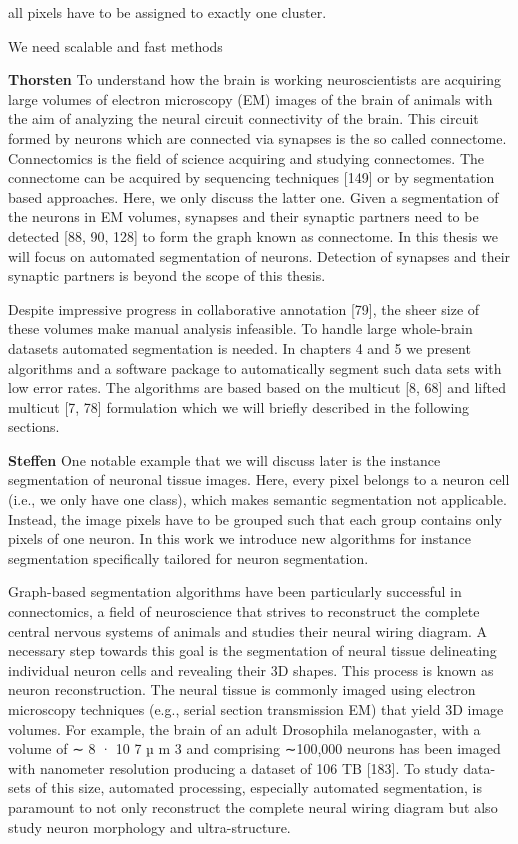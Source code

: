 all pixels have to be assigned to exactly one cluster. 

We need scalable and fast methods



\textbf{Thorsten}
To understand how the brain is working neuroscientists are acquiring large volumes of electron microscopy (EM) images of the brain of animals with the aim of analyzing the neural circuit connectivity of the brain. This circuit formed by neurons which are connected via synapses is the so called connectome. Connectomics is the ﬁeld of science acquiring and studying connectomes. The connectome can be acquired by sequencing techniques [149] or by segmentation based approaches. Here, we only discuss the latter one. Given a segmentation of the neurons in EM volumes, synapses and their synaptic partners need to be detected [88, 90, 128] to form the graph known as connectome. In this thesis we will focus on automated segmentation of neurons. Detection of synapses and their synaptic partners is beyond the scope of this thesis.

Despite impressive progress in collaborative annotation [79], the sheer size of these volumes make manual analysis infeasible. To handle large whole-brain datasets automated segmentation is needed. In chapters 4 and 5 we present algorithms and a software package to automatically segment such data sets with low error rates. The algorithms are based based on the multicut [8, 68] and lifted multicut [7, 78] formulation which we will brieﬂy described in the following sections.

\textbf{Steffen}
One notable example that we will discuss later is the instance segmentation of neuronal tissue images. Here, every pixel belongs to a neuron cell (i.e., we only have one class), which makes semantic segmentation not applicable. Instead, the image pixels have to be grouped such that each group contains only pixels of one neuron. In this work we introduce new algorithms for instance segmentation speciﬁcally tailored for neuron segmentation.

Graph-based segmentation algorithms have been particularly successful in connectomics, a ﬁeld of neuroscience that strives to reconstruct the complete central nervous systems of animals and studies their neural wiring diagram. A necessary step towards this goal is the segmentation of neural tissue delineating individual neuron cells and revealing their 3D shapes. This process is known as neuron reconstruction. The neural tissue is commonly imaged using electron microscopy techniques (e.g., serial section transmission EM) that yield 3D image volumes. For example, the brain of an adult Drosophila melanogaster, with a volume of ∼ 8 · 10 7 µ m 3 and comprising ∼100,000 neurons has been imaged with nanometer resolution producing a dataset of 106 TB [183]. To study data-sets of this size, automated processing, especially automated segmentation, is paramount to not only reconstruct the complete neural wiring diagram but also study neuron morphology and ultra-structure.

